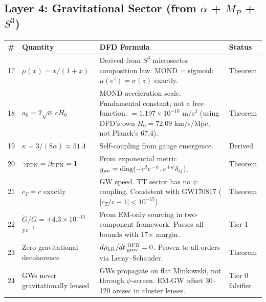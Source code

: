 \documentclass[12pt,a4paper]{article}
\begin{document}
\subsection{Layer 4: Gravitational Sector (from $\alpha$ + $M_P$ + $S^3$)}

\begin{longtable}{p{0.5cm}p{4cm}p{6.5cm}p{2.5cm}}
\toprule
\# & \textbf{Quantity} & \textbf{DFD Formula} & \textbf{Status} \\
\midrule
\endhead
17 & $\mu(x) = x/(1+x)$ &
  Derived from $S^3$ microsector composition law.
  MOND = sigmoid: $\mu(e^z) = \sigma(z)$ exactly. &
  Theorem \\[4pt]

18 & $a_0 = 2\sqrt{\alpha}\,cH_0$ &
  MOND acceleration scale.  Fundamental constant,
  not a free function.  $= 1.197 \times 10^{-10}$ m/s$^2$
  (using DFD's own $H_0 = 72.09$ km/s/Mpc, not Planck's 67.4). &
  Theorem \\[4pt]

19 & $\kappa = 3/(8\alpha) \approx 51.4$ &
  Self-coupling from gauge emergence. &
  Derived \\[4pt]

20 & $\gamma_{\rm PPN} = \beta_{\rm PPN} = 1$ &
  From exponential metric
  $g_{\mu\nu} = {\rm diag}(-c^2 e^{-\psi}, e^{+\psi}\delta_{ij})$. &
  Theorem \\[4pt]

21 & $c_T = c$ exactly &
  GW speed.  TT sector has no $\psi$ coupling.
  Consistent with GW170817 ($|c_T/c - 1| < 10^{-15}$). &
  Theorem \\[4pt]

22 & $\dot{G}/G = +4.3 \times 10^{-15}$ yr$^{-1}$ &
  From EM-only sourcing in two-component framework.
  Passes all bounds with 17$\times$ margin. &
  Tier 1 \\[4pt]

23 & Zero gravitational decoherence &
  $d\rho_{\rm LR}/dt|_{\rm grav}^{\rm DFD} = 0$.
  Proven to all orders via Leray--Schauder. &
  Theorem \\[4pt]

24 & GWs never gravitationally lensed &
  GWs propagate on flat Minkowski, not through $\psi$-screen.
  EM-GW offset 30--120 arcsec in cluster lenses. &
  Tier 0 falsifier \\[4pt]

\bottomrule
\end{longtable}
\end{document}
